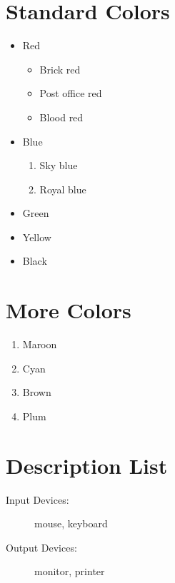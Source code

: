 \documentclass{article}
\begin{document}
	\renewcommand{\labelitemi}{$\diamond$} %
	\renewcommand{\labelitemii}{$\blacksquare$} %
	\section{Standard Colors}
	\begin{itemize}
		\item Red
		\begin{itemize} %
			\item Brick red
			\item Post office red
			\item Blood red
		\end{itemize}
		\item Blue
		\begin{enumerate} %
			\item Sky blue
			\item Royal blue
		\end{enumerate}
		\item Green
		\item Yellow
		\item Black
	\end{itemize}
	
	\section{More Colors}
	\begin{enumerate}
		\item Maroon
		\item Cyan
		\item Brown
		\item Plum
	\end{enumerate}
	
	\section{Description List}
	\begin{description}
		\item[Input Devices:] mouse, keyboard
		\item[Output Devices:] monitor, printer
	\end{description}
\end{document}
